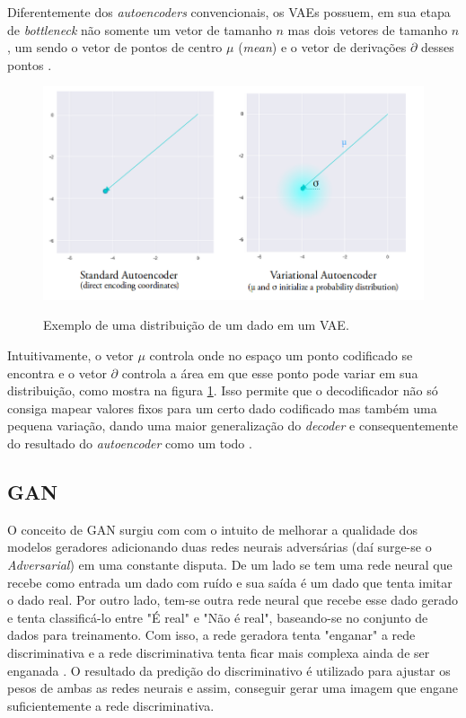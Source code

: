 Diferentemente dos \textit{autoencoders} convencionais, os VAEs possuem, em sua etapa de \textit{bottleneck} não somente um vetor de tamanho $n$ mas dois vetores de tamanho $n$, um sendo o vetor de pontos de centro $\mu$ (\textit{mean}) e o vetor de derivações $\partial$ desses pontos \cite{variational-autoencoders}.

\begin{figure}[H]
  \centering
  \caption{Exemplo de uma distribuição de um dado em um VAE.}
  \includegraphics[scale=0.4]{figuras/variational-autoencoders.png}
  \label{fig:variational-autoencoders}
\end{figure}

Intuitivamente, o vetor $\mu$ controla onde no espaço um ponto codificado se encontra e o vetor $\partial$ controla a área em que esse ponto pode variar em sua distribuição, como mostra na figura \ref{fig:variational-autoencoders}. Isso permite que o decodificador não só consiga mapear valores fixos para um certo dado codificado mas também uma pequena variação, dando uma maior generalização do \textit{decoder} e consequentemente do resultado do \textit{autoencoder} como um todo \cite{variational-autoencoders}.

\subsection{GAN}

O conceito de GAN surgiu com  com o intuito de melhorar a qualidade dos modelos geradores adicionando duas redes neurais adversárias (daí surge-se o \textit{Adversarial}) em uma constante disputa. De um lado se tem uma rede neural que recebe como entrada um dado com ruído e sua saída é um dado que tenta imitar o dado real. Por outro lado, tem-se outra rede neural que recebe esse dado gerado e tenta classificá-lo entre "É real" e "Não é real", baseando-se no conjunto de dados para treinamento. Com isso, a rede geradora tenta "enganar" a rede discriminativa e a rede discriminativa tenta ficar mais complexa ainda de ser enganada \cite{generative-adversarial-networks}. O resultado da predição do discriminativo é utilizado para ajustar os pesos de ambas as redes neurais e assim, conseguir gerar uma imagem que engane suficientemente a rede discriminativa.

